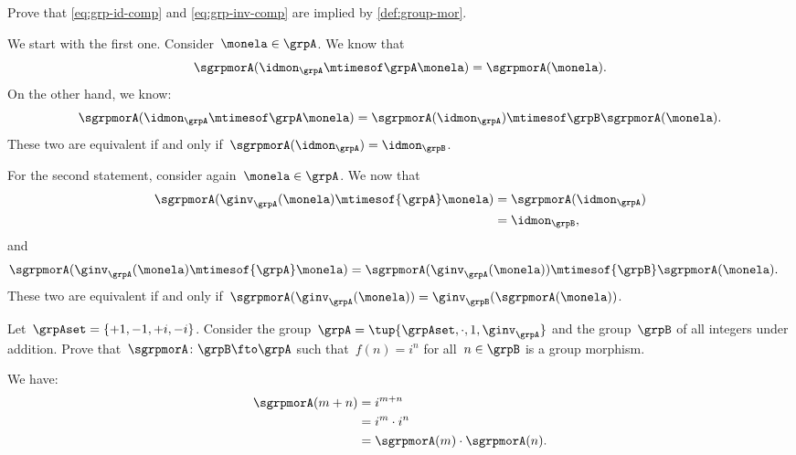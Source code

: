 \begin{exercise}
    Prove that \cref{eq:grp-id-comp} and \cref{eq:grp-inv-comp} are implied by \cref{def:group-mor}.
\end{exercise}
\begin{solution}
    We start with the first one.
    Consider~$\monela \in \grpA$.
    We know that
    \begin{equation*}
        \sgrpmorA(\idmon_\grpA \mtimesof\grpA \monela)=\sgrpmorA(\monela).
    \end{equation*}
    On the other hand, we know:
    \begin{equation*}
        \sgrpmorA(\idmon_\grpA \mtimesof\grpA \monela) = \sgrpmorA(\idmon_\grpA)\mtimesof\grpB \sgrpmorA(\monela).
    \end{equation*}
    These two are equivalent if and only if~$\sgrpmorA(\idmon_\grpA)=\idmon_\grpB$.

    For the second statement, consider again~$\monela \in \grpA$.
    We now that
    \begin{equation*}
        \begin{aligned}
            \sgrpmorA(\ginv_{\grpA}(\monela)\mtimesof{\grpA} \monela) & =\sgrpmorA(\idmon_\grpA) \\
                                                                      & =\idmon_\grpB,
        \end{aligned}
    \end{equation*}
    and
    \begin{equation*}
        \begin{aligned}
            \sgrpmorA(\ginv_{\grpA}(\monela)\mtimesof{\grpA} \monela) & =\sgrpmorA(\ginv_{\grpA}(\monela))\mtimesof{\grpB} \sgrpmorA(\monela).
        \end{aligned}
    \end{equation*}
    These two are equivalent if and only if~$\sgrpmorA(\ginv_{\grpA}(\monela))=\ginv_{\grpB}(\sgrpmorA(\monela))$.

\end{solution}

\begin{exercise}
    Let~$\grpAset=\{+1,-1,+i,-i\}$.
    Consider the group~$\grpA=\tup{\grpAset, \cdot, 1, \ginv_\grpA}$ and the group~$\grpB$ of all integers under addition.
    Prove that~$\sgrpmorA\colon \grpB \fto \grpA$ such that~$f(n)=i^n$ for all~$n\in \grpB$ is a group morphism.
\end{exercise}
\begin{solution}
    We have:
    \begin{equation*}
        \begin{aligned}
            \sgrpmorA(m+n) & =i^{m+n}                         \\
                           & =i^m \cdot i^n                   \\
                           & =\sgrpmorA(m)\cdot \sgrpmorA(n).
        \end{aligned}
    \end{equation*}
\end{solution}

